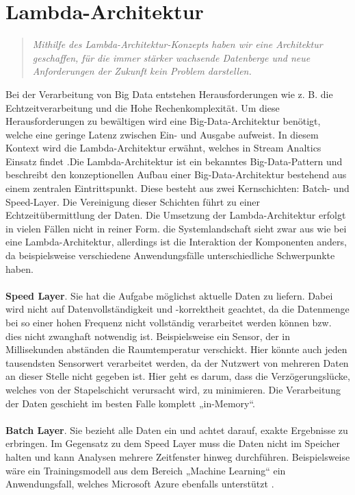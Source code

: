 \section{Lambda-Architektur}

\begin{quote} \textit{\glqq Mithilfe des Lambda-Architektur-Konzepts haben wir eine Architektur geschaffen, für die immer stärker wachsende Datenberge und neue Anforderungen der Zukunft kein Problem darstellen. \grqq~}\cite[S.2]{opitz.2017}\end{quote} 
Bei der Verarbeitung von Big Data entstehen Herausforderungen wie z. B. die Echtzeitverarbeitung und die Hohe Rechenkomplexität. Um diese Herausforderungen zu bewältigen wird eine Big-Data-Architektur benötigt, welche eine geringe Latenz zwischen Ein- und Ausgabe aufweist. In diesem Kontext wird die Lambda-Architektur erwähnt, welches in Stream Analtics Einsatz findet \cite{Familiar.2017}.Die  Lambda-Architektur ist ein bekanntes Big-Data-Pattern und beschreibt den  konzeptionellen  Aufbau  einer  Big-Data-Architektur bestehend  aus  einem  zentralen  Eintrittspunkt. Diese besteht aus zwei Kernschichten: Batch- und Speed-Layer. Die Vereinigung dieser Schichten führt zu einer Echtzeitübermittlung der Daten. Die Umsetzung der Lambda-Architektur erfolgt in vielen Fällen nicht in reiner Form. die Systemlandschaft sieht zwar aus wie bei eine Lambda-Architektur, allerdings ist die Interaktion der Komponenten anders, da beispielsweise verschiedene Anwendungsfälle unterschiedliche Schwerpunkte haben.  \\ \\ \textbf{Speed Layer}. Sie hat die Aufgabe möglichst aktuelle Daten zu liefern. Dabei wird nicht auf Datenvollständigkeit und -korrektheit geachtet, da die Datenmenge bei so einer hohen Frequenz nicht vollständig verarbeitet werden können bzw. dies nicht zwanghaft notwendig ist. Beispielsweise ein Sensor, der in Millisekunden abständen die Raumtemperatur verschickt. Hier könnte auch jeden tausendsten Sensorwert verarbeitet werden, da der Nutzwert von mehreren Daten an dieser Stelle nicht gegeben ist. Hier geht es darum, dass die Verzögerungslücke, welches von der Stapelschicht verursacht wird, zu minimieren. Die Verarbeitung der Daten geschieht im besten Falle komplett „in-Memory“.\\ \\ \textbf{Batch Layer}. Sie bezieht alle Daten ein und achtet darauf, exakte Ergebnisse zu erbringen. Im Gegensatz zu dem Speed Layer muss die Daten nicht im Speicher halten und kann Analysen mehrere Zeitfenster hinweg durchführen. Beispielsweise wäre ein Trainingsmodell aus dem Bereich „Machine Learning“ ein Anwendungsfall, welches Microsoft Azure ebenfalls unterstützt \cite{Berle.2017}. 

